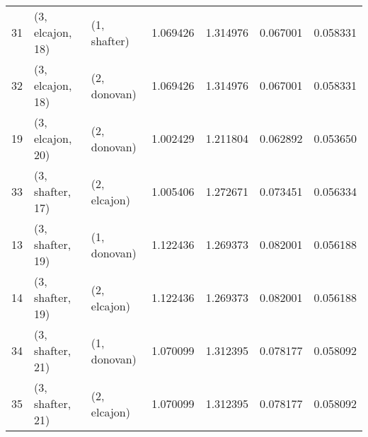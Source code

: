 \begin{tabular}{lllrrrr}
31 &  (3, elcajon, 18) &     (1, shafter) &  1.069426 &  1.314976 &   0.067001 &  0.058331 \\
32 &  (3, elcajon, 18) &     (2, donovan) &  1.069426 &  1.314976 &   0.067001 &  0.058331 \\
19 &  (3, elcajon, 20) &     (2, donovan) &  1.002429 &  1.211804 &   0.062892 &  0.053650 \\
33 &  (3, shafter, 17) &     (2, elcajon) &  1.005406 &  1.272671 &   0.073451 &  0.056334 \\
13 &  (3, shafter, 19) &     (1, donovan) &  1.122436 &  1.269373 &   0.082001 &  0.056188 \\
14 &  (3, shafter, 19) &     (2, elcajon) &  1.122436 &  1.269373 &   0.082001 &  0.056188 \\
34 &  (3, shafter, 21) &     (1, donovan) &  1.070099 &  1.312395 &   0.078177 &  0.058092 \\
35 &  (3, shafter, 21) &     (2, elcajon) &  1.070099 &  1.312395 &   0.078177 &  0.058092 \\
\bottomrule
\end{tabular}
